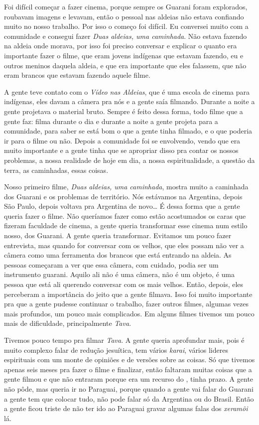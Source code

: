 {{Foi difícil começar a fazer cinema, porque sempre os Guarani foram
explorados, roubavam imagens e levavam, então o pessoal nas aldeias não
estava confiando muito no nosso trabalho. Por isso o começo foi
difícil. Eu conversei muito com a comunidade e consegui fazer \emph{Duas
aldeias, uma caminhada}. Não estava fazendo na aldeia onde morava, por
isso foi preciso conversar e explicar o quanto era importante fazer o
filme, que eram jovens indígenas que estavam fazendo, eu e outros
meninos daquela aldeia, e que era importante que eles falassem, que não
eram brancos que estavam fazendo aquele filme. 

A gente teve contato com o \emph{Vídeo nas Aldeias}, que é uma escola de
cinema para indígenas, eles davam a câmera pra nós e a gente saía
filmando. Durante a noite a gente projetava o material bruto. Sempre é
feito dessa forma, todo filme que a gente faz: filma durante o dia e
durante a noite a gente projeta para a comunidade, para saber se está
bom o que a gente tinha filmado, e o que poderia ir para o filme ou não.
Depois a comunidade foi se envolvendo, vendo que era muito importante e
a gente tinha que se apropriar disso pra contar os nossos problemas, a
nossa realidade de hoje em dia, a nossa espiritualidade, a questão da
terra, as caminhadas, essas coisas.

Nosso primeiro filme, \emph{Duas aldeias, uma caminhada}, mostra muito a
caminhada dos Guarani e os problemas de território. Nós estávamos na
Argentina, depois São Paulo, depois voltava pra Argentina de novo\ldots{} É
dessa forma que a gente queria fazer o filme. Não queríamos fazer como
estão acostumados os caras que fizeram faculdade de cinema, a gente
queria transformar esse cinema num estilo nosso, dos Guarani. A gente
queria transformar. Evitamos um pouco fazer entrevista, mas quando for
conversar com os velhos, que eles possam não ver a câmera como uma
ferramenta dos brancos que está entrando na aldeia. As pessoas começaram
a ver que essa câmera, com cuidado, podia ser um instrumento guarani.
Aquilo ali não é uma câmera, não é um objeto, é uma pessoa que está ali
querendo conversar com os mais velhos. Então, depois, eles perceberam a
importância do jeito que a gente filmava. Isso foi muito importante pra
que a gente pudesse continuar o trabalho, fazer outros filmes, algumas
vezes mais profundos, um pouco mais complicados. Em alguns filmes
tivemos um pouco mais de dificuldade, principalmente \emph{Tava}.

Tivemos pouco tempo pra filmar \emph{Tava}. A gente queria aprofundar mais,
pois é muito complexo falar de redução jesuítica, tem vários \emph{karai},
vários lideres espirituais com um monte de opiniões e de versões sobre
as coisas. Só que tivemos apenas seis meses pra fazer o filme e
finalizar, então faltaram muitas coisas que a gente filmou e que não
entraram porque era um recurso do , tinha prazo. A gente não pôde,
mas queria ir no Paraguai, porque quando a gente vai falar do Guarani a
gente tem que colocar tudo, não pode falar só da Argentina ou do
Brasil. Então a gente ficou triste de não ter ido ao Paraguai gravar
algumas falas dos \emph{xeramõi} lá. 

}}
